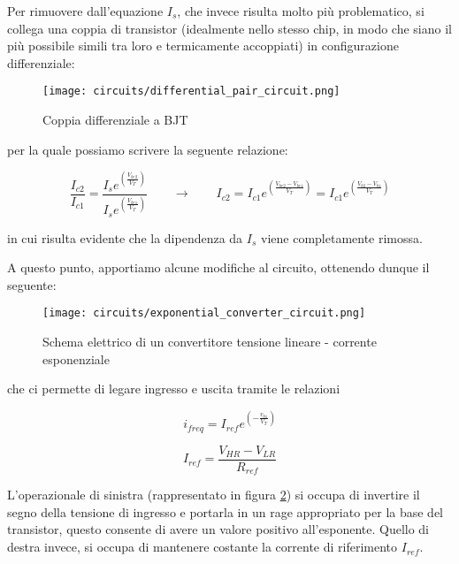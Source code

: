 Per rimuovere dall'equazione $I_s$, che invece risulta molto più problematico, si collega
una coppia di transistor (idealmente nello stesso chip, in modo che siano il più possibile
simili tra loro e termicamente accoppiati) in configurazione differenziale:
\medskip

\begin{figure}[ht]
    \centering
    \texttt{[image: circuits/differential\_pair\_circuit.png]}
    \caption{Coppia differenziale a BJT}
    \label{differential_pair_circuit}
\end{figure}

per la quale possiamo scrivere la seguente relazione:

\begin{displaymath}
    \frac{I_{c2}}{I_{c1}}=\frac{I_s e^{\left(\frac{V_{be2}}{V_T}\right)}}{I_s e^{\left(\frac{V_{be1}}{V_T}\right)}}
    \qquad
    \rightarrow
    \qquad
    I_{c2}=I_{c1}e^{\left(\frac{V_{be2}-V_{be1}}{V_T}\right)}=I_{c1}e^{\left(\frac{V_{b2}-V_{b1}}{V_T}\right)}
\end{displaymath}

in cui risulta evidente che la dipendenza da $I_s$ viene completamente rimossa.

A questo punto, apportiamo alcune modifiche al circuito, ottenendo dunque il seguente:
\medskip

\begin{figure}[ht]
    \centering
    \texttt{[image: circuits/exponential\_converter\_circuit.png]}
    \caption{Schema elettrico di un convertitore tensione lineare - corrente esponenziale}
    \label{exponential_converter_circuit}
\end{figure}

che ci permette di legare ingresso e uscita tramite le relazioni

\begin{displaymath}
    i_{freq}=I_{ref}e^{\left(-\frac{v_{b1}}{V_T}\right)}
\end{displaymath}

\begin{displaymath}
    I_{ref}=\frac{V_{HR}-V_{LR}}{R_{ref}}
\end{displaymath}

L'operazionale di sinistra (rappresentato in figura \ref{exponential_converter_circuit})
si occupa di invertire il segno della tensione di ingresso e portarla in un rage appropriato
per la base del transistor, questo consente di avere un valore positivo all'esponente. Quello
di destra invece, si occupa di mantenere costante la corrente di riferimento $I_{ref}$.

